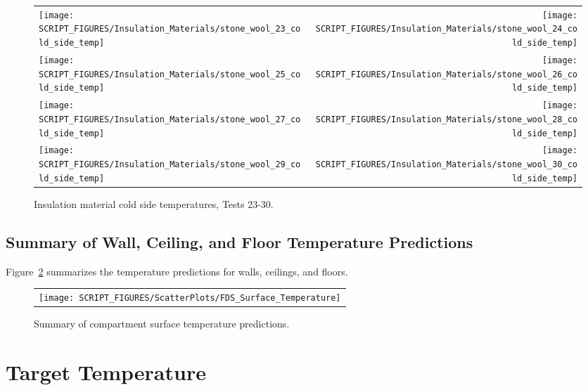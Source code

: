 \begin{figure}[p]
	\begin{tabular*}{\textwidth}{l@{\extracolsep{\fill}}r}
		\texttt{[image: SCRIPT\_FIGURES/Insulation\_Materials/stone\_wool\_23\_cold\_side\_temp]} &
		\texttt{[image: SCRIPT\_FIGURES/Insulation\_Materials/stone\_wool\_24\_cold\_side\_temp]} \\
		\texttt{[image: SCRIPT\_FIGURES/Insulation\_Materials/stone\_wool\_25\_cold\_side\_temp]} &
		\texttt{[image: SCRIPT\_FIGURES/Insulation\_Materials/stone\_wool\_26\_cold\_side\_temp]} \\
		\texttt{[image: SCRIPT\_FIGURES/Insulation\_Materials/stone\_wool\_27\_cold\_side\_temp]} &
		\texttt{[image: SCRIPT\_FIGURES/Insulation\_Materials/stone\_wool\_28\_cold\_side\_temp]} \\
		\texttt{[image: SCRIPT\_FIGURES/Insulation\_Materials/stone\_wool\_29\_cold\_side\_temp]} &
		\texttt{[image: SCRIPT\_FIGURES/Insulation\_Materials/stone\_wool\_30\_cold\_side\_temp]}
	\end{tabular*}
    \caption[Insulation material cold side temperatures, Tests 23-30]{Insulation material cold side temperatures, Tests 23-30.}
    \label{wool_4}
\end{figure}

\clearpage

\subsection{Summary of Wall, Ceiling, and Floor Temperature Predictions}
\label{Surface Temperature}

Figure~\ref{Summary_Surface_Temperature} summarizes the temperature predictions for walls, ceilings, and floors.

\begin{figure}[h!]
\begin{center}
\begin{tabular}{c}
\texttt{[image: SCRIPT\_FIGURES/ScatterPlots/FDS\_Surface\_Temperature]}
\end{tabular}
\end{center}
\caption[Summary of compartment surface temperature predictions]
{Summary of compartment surface temperature predictions.}
\label{Summary_Surface_Temperature}
\end{figure}

\clearpage

\section{Target Temperature}

